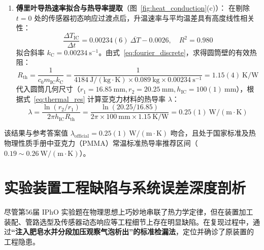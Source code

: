 \documentclass[10pt, a4paper]{ctexart}
\begin{document}
\begin{enumerate}
\textbf{实测交点与外推交点的本质区别：} 当 $\Delta T < 5.0^\circ\mathrm{C}$ 时（图~\ref{fig:heat_conduction}(b) 中的空心散点），筒间导热速率显著衰减，系统向环境空气的自然对流与辐射散热占据主导，导致实验点脱离线性外推轨道向左侧弯曲，最终在 $50.7^\circ\mathrm{C}$ 处提前达到实际温差为零。这充分说明：\textbf{这里采用的线性区外推法更加符合实际，其核心物理精髓在于利用强换热区间的初态数据消除后期非绝热环境散热带来的系统降温误差}。

\item \textbf{傅里叶导热速率拟合与热导率提取}（图~\ref{fig:heat_conduction}(c)）：
在剔除 $t=0$ 处的传感器初态响应过渡点后，升温速率与平均温差具有高度线性相关性：
\begin{equation}
\frac{\Delta T_{\mathrm{IC}}}{\Delta t} = 0.00234(6)\ \overline{\Delta T} - 0.0026, \quad R^2 = 0.980
\end{equation}
拟合斜率 $k_{\mathrm{C}} = 0.00234\ \mathrm{s^{-1}}$。由式~\eqref{eq:fourier_discrete}，求得圆筒壁的有效热阻：
\begin{equation}
R_{\mathrm{th}} = \frac{1}{c_0 m_{\mathrm{IC}} k_{\mathrm{C}}} = \frac{1}{4184\ \mathrm{J/(kg\cdot K)} \times 0.089\ \mathrm{kg} \times 0.00234\ \mathrm{s^{-1}}} = 1.15(4)\ \mathrm{K/W}
\end{equation}
代入圆筒几何尺寸（$r_1 = 16.85\ \mathrm{mm}, r_2 = 20.25\ \mathrm{mm}, h_{\mathrm{IC}} = 100(1)\ \mathrm{mm}$），根据式~\eqref{eq:thermal_res} 计算亚克力材料的热导率 $\lambda$：
\begin{equation}
\lambda = \frac{\ln(r_2/r_1)}{2\pi h_{\mathrm{IC}} R_{\mathrm{th}}} = \frac{\ln(20.25/16.85)}{2\pi \times 100\ \mathrm{mm} \times 1.15\ \mathrm{K/W}} = 0.25(1)\ \mathrm{W/(m\cdot K)}
\end{equation}
\end{enumerate}
该结果与参考答案值 $\lambda_{\mathrm{official}} = 0.25(1)\ \mathrm{W/(m\cdot K)}$ 吻合，且处于国家标准及热物理性质手册中亚克力（PMMA）常温标准热导率推荐区间（$0.19\sim 0.26\ \mathrm{W/(m\cdot K)}$）\cite{ref10, ref11}。

\section{实验装置工程缺陷与系统误差深度剖析}
尽管第56届 IPhO 实验题在物理思想上巧妙地串联了热力学定律，但在装置加工装配、管路选型及传感器动态响应等工程细节上存在明显缺陷。在复现过程中，通过\textbf{“注入肥皂水并分段加压观察气泡析出”的标准检漏法}，定位并确诊了原装置的工程隐患。
\end{document}

